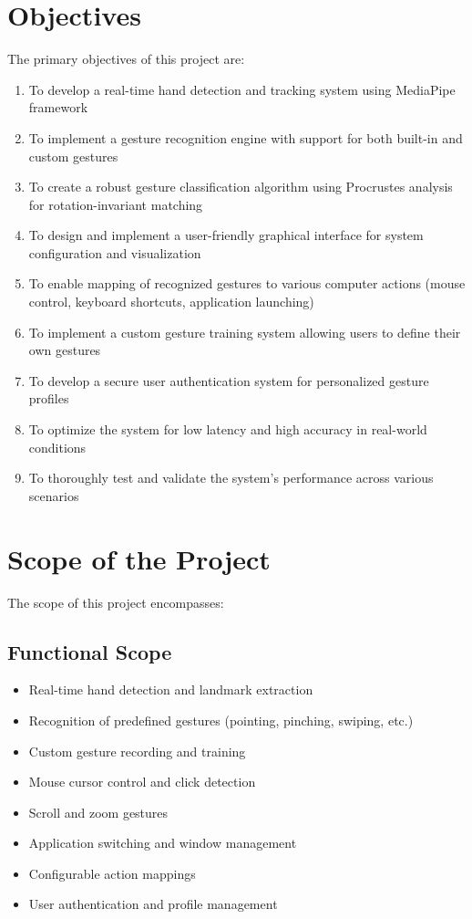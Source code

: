 \documentclass[12pt,a4paper]{report}
\begin{document}
\section{Objectives}

The primary objectives of this project are:

\begin{enumerate}
    \item To develop a real-time hand detection and tracking system using MediaPipe framework
    \item To implement a gesture recognition engine with support for both built-in and custom gestures
    \item To create a robust gesture classification algorithm using Procrustes analysis for rotation-invariant matching
    \item To design and implement a user-friendly graphical interface for system configuration and visualization
    \item To enable mapping of recognized gestures to various computer actions (mouse control, keyboard shortcuts, application launching)
    \item To implement a custom gesture training system allowing users to define their own gestures
    \item To develop a secure user authentication system for personalized gesture profiles
    \item To optimize the system for low latency and high accuracy in real-world conditions
    \item To thoroughly test and validate the system's performance across various scenarios
\end{enumerate}

\section{Scope of the Project}

The scope of this project encompasses:

\subsection{Functional Scope}
\begin{itemize}
    \item Real-time hand detection and landmark extraction
    \item Recognition of predefined gestures (pointing, pinching, swiping, etc.)
    \item Custom gesture recording and training
    \item Mouse cursor control and click detection
    \item Scroll and zoom gestures
    \item Application switching and window management
    \item Configurable action mappings
    \item User authentication and profile management
\end{itemize}
\end{document}
